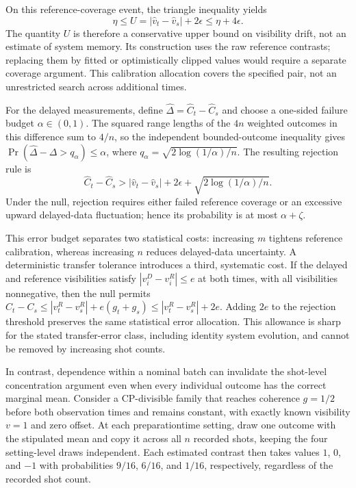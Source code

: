 \documentclass[11pt]{article}
\begin{document}
On this reference-coverage event, the triangle inequality yields \[\eta\leq U=|\widehat v_t-\widehat v_s|+2\epsilon\leq\eta+4\epsilon.\] The quantity $U$ is therefore a conservative upper bound on visibility drift, not an estimate of system memory. Its construction uses the raw reference contrasts; replacing them by fitted or optimistically clipped values would require a separate coverage argument. This calibration allocation covers the specified pair, not an unrestricted search across additional times.

For the delayed measurements, define $\widehat\Delta=\widehat C_t-\widehat C_s$ and choose a one-sided failure budget $\alpha\in(0,1)$. The squared range lengths of the $4n$ weighted outcomes in this difference sum to $4/n$, so the independent bounded-outcome inequality gives $\Pr(\widehat\Delta-\Delta>q_\alpha)\leq\alpha$, where $q_\alpha=\sqrt{2\log(1/\alpha)/n}$. The resulting rejection rule is \[\widehat C_t-\widehat C_s>|\widehat v_t-\widehat v_s|+2\epsilon+\sqrt{2\log(1/\alpha)/n}.\] Under the null, rejection requires either failed reference coverage or an excessive upward delayed-data fluctuation; hence its probability is at most $\alpha+\zeta$.

This error budget separates two statistical costs: increasing $m$ tightens reference calibration, whereas increasing $n$ reduces delayed-data uncertainty. A deterministic transfer tolerance introduces a third, systematic cost. If the delayed and reference visibilities satisfy $|v_i^{D}-v_i^{R}|\leq e$ at both times, with all visibilities nonnegative, then the null permits $C_t-C_s\leq|v_t^{R}-v_s^{R}|+e(g_t+g_s)\leq|v_t^{R}-v_s^{R}|+2e$. Adding $2e$ to the rejection threshold preserves the same statistical error allocation. This allowance is sharp for the stated transfer-error class, including identity system evolution, and cannot be removed by increasing shot counts.

In contrast, dependence within a nominal batch can invalidate the shot-level concentration argument even when every individual outcome has the correct marginal mean. Consider a CP-divisible family that reaches coherence $g=1/2$ before both observation times and remains constant, with exactly known visibility $v=1$ and zero offset. At each preparation\textendash{}\allowbreak{}time setting, draw one outcome with the stipulated mean and copy it across all $n$ recorded shots, keeping the four setting-level draws independent. Each estimated contrast then takes values $1$, $0$, and $-1$ with probabilities $9/16$, $6/16$, and $1/16$, respectively, regardless of the recorded shot count.
\end{document}
